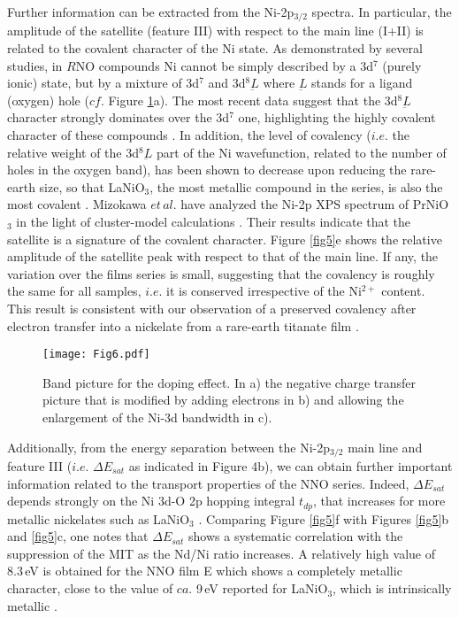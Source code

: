 \documentclass[aip,graphicx,numerical]{revtex4-1}
\begin{document}
Further information can be extracted from the Ni-2p$_{3/2}$ spectra. In particular, the amplitude of the satellite (feature III) with respect to the main line (I+II) is related to the covalent character of the Ni state. As demonstrated by several studies, in $R$NO compounds Ni cannot be simply described by a 3d$^7$ (purely ionic) state, but by a mixture of 3d$^7$ and 3d$^8\underbar L$ where $\underbar L$ stands for a ligand (oxygen) hole ($cf.$ Figure \ref{fig6}a). The most recent data suggest that the 3d$^8\underbar L$ character strongly dominates over the 3d$^7$ one, highlighting the highly covalent character of these compounds \cite{Bisogni2016} . In addition, the level of covalency ($i.e.$ the relative weight of the 3d$^8\underbar L$ part of the Ni wavefunction, related to the number of holes in the oxygen band), has been shown to decrease upon reducing the rare-earth size, so that LaNiO$_3$, the most metallic compound in the series, is also the most covalent \cite{Freeland201656} . Mizokawa $et\,al.$ have analyzed the Ni-2p XPS spectrum of PrNiO$_3$ in the light of cluster-model calculations \cite{Mizokawa_1995} . Their results indicate that the satellite is a signature of the covalent character. Figure \ref{fig5}e shows the relative amplitude of the satellite peak with respect to that of the main line. If any, the variation over the films series is small, suggesting that the covalency is roughly the same for all samples, $i.e.$ it is conserved irrespective of the Ni$^{2+}$ content. This result is consistent with our observation of a preserved covalency after electron transfer into a nickelate from a rare-earth titanate film \cite{Grisolia2016} .  \\
\begin{figure}
  \texttt{[image: Fig6.pdf]}
  \caption{Band picture for the doping effect. In a) the negative charge transfer picture that is modified by adding electrons in b) and allowing the enlargement of the Ni-3d bandwidth in c).}
  \label{fig6}
\end{figure}
Additionally, from the energy separation between the Ni-2p$_{3/2}$ main line and feature III ($i.e.$ $\Delta E_{sat}$ as indicated in Figure 4b), we can obtain further important information related to the transport properties of the NNO series. Indeed, $\Delta E_{sat}$ depends strongly on the Ni 3d-O 2p hopping integral $t_{dp}$, that increases for more metallic nickelates such as LaNiO$_3$ \cite{Barman_1994} . Comparing Figure \ref{fig5}f with Figures \ref{fig5}b and \ref{fig5}c, one notes that $\Delta E_{sat}$ shows a systematic correlation with the suppression of the MIT as the Nd/Ni ratio increases. A relatively high value of 8.3\,eV is obtained for the NNO film E which shows a completely metallic character, close to the value of $ca.$ 9\,eV reported for LaNiO$_3$, which is intrinsically metallic \cite{Barman_1994} .\\
\end{document}

